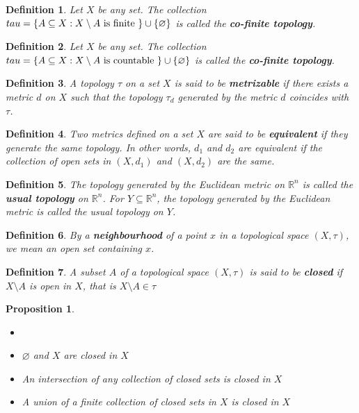 \documentclass[12pt,twoside]{report}
\newtheorem{defn}{Definition}
\newtheorem{prop}[subsection]{Proposition}
\begin{document}
\begin{defn}
    Let $X$ be any set. The collection $\\tau = \left\{ A \subseteq X  :  X \setminus A \text{ is finite } \right\} \cup \left\{ \varnothing \right\}$ is called the \textbf{co-finite topology}.
\end{defn}

\begin{defn}
    Let $X$ be any set. The collection $\\tau = \left\{ A \subseteq X  :  X \setminus A \text{ is countable } \right\} \cup \left\{ \varnothing \right\}$ is called the \textbf{co-finite topology}.
\end{defn}



\begin{defn}
A topology $\tau$ on a set $X$ is said to be \textbf{metrizable} if there exists a metric $d$ on $X$ such that the topology $\tau_d$ generated by the metric $d$ coincides with $\tau$.
\end{defn}

\begin{defn}
Two metrics defined on a set $X$ are said to be \textbf{equivalent} if they generate the same topology. 
In other words, $d_1$ and $d_2$ are equivalent if the collection of open sets in $\left (X, d_1\right )$ and $\left (X, d_2\right )$ are the same.
\end{defn}

\begin{defn}
The topology generated by the Euclidean metric on $\mathbb{R} ^n$ is called the \textbf{usual topology} on $\mathbb{R} ^n$.
For $Y \subseteq \mathbb{R} ^n$, the topology generated by the Euclidean metric is called the usual topology on $Y$.
\end{defn}

\begin{defn}
By a \textbf{neighbourhood} of a point $x$ in a topological space $\left (X, \tau\right )$, we mean an open set containing $x$.
\end{defn}

\begin{defn}
A subset $A$ of a topological space $\left (X, \tau\right )$ is said to be \textbf{closed} if $X \setminus A$ is open in $X$, that is $X \setminus A \in \tau$
\end{defn}

\begin{prop}
    \begin{itemize}
        \item[]
        \item  $\varnothing$ and $X$ are closed in $X$
        \item An intersection of any collection of closed sets is closed in $X$
        \item A union of a \textit{finite} collection of closed sets in $X$ is closed in $X$
    \end{itemize}
\end{prop}
\end{document}
